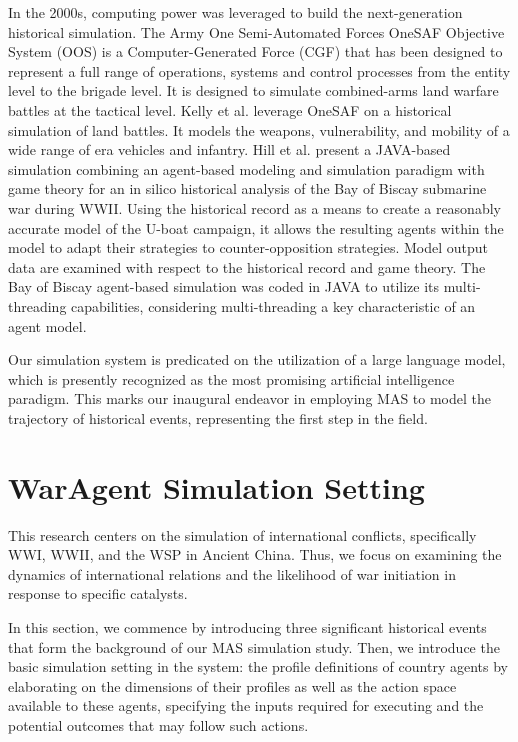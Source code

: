 \documentclass{article}
\begin{document}
In the 2000s, computing power was leveraged to build the next-generation historical simulation. The Army One Semi-Automated Forces OneSAF Objective System (OOS) \cite{tollefson2008onesaf} is a Computer-Generated Force (CGF) that has been designed to represent a full range of operations, systems and control processes from the entity level to the brigade level. It is designed to simulate combined-arms land warfare battles at the tactical level. Kelly et al. \cite{kellycreating} leverage OneSAF on a historical simulation of land battles. It models the weapons, vulnerability, and mobility of a wide range of era vehicles and infantry. Hill et al. \cite{hill2004using} present a JAVA-based simulation combining an agent-based modeling and simulation paradigm with game theory for an in silico historical analysis of the Bay of Biscay submarine war during WWII. Using the historical record as a means to create a reasonably accurate model of the U-boat campaign, it allows the resulting agents within the model to adapt their strategies to counter-opposition strategies. Model output data are examined with respect to the historical record and game theory. The Bay of Biscay agent-based simulation was coded in JAVA to utilize its multi-threading capabilities, considering multi-threading a key characteristic of an agent model.

Our simulation system is predicated on the utilization of a large language model, which is presently recognized as the most promising artificial intelligence paradigm. This marks our inaugural endeavor in employing MAS to model the trajectory of historical events, representing the first step in the field.

\section{WarAgent Simulation Setting}
This research centers on the simulation of international conflicts, specifically WWI, WWII, and the WSP in Ancient China. Thus, we focus on examining the dynamics of international relations and the likelihood of war initiation in response to specific catalysts.

In this section, we commence by introducing three significant historical events that form the background of our MAS simulation study. Then, we introduce the basic simulation setting in the system: the profile definitions of country agents by elaborating on the dimensions of their profiles as well as the action space available to these agents, specifying the inputs required for executing and the potential outcomes that may follow such actions.
\end{document}
